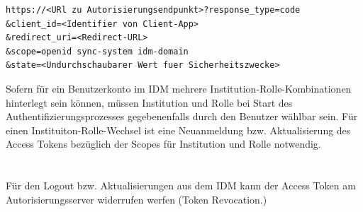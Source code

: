 \begin{lstlisting}[caption={},frame=tlrb]
https://<URl zu Autorisierungsendpunkt>?response_type=code
&client_id=<Identifier von Client-App>
&redirect_uri=<Redirect-URL>
&scope=openid sync-system idm-domain
&state=<Undurchschaubarer Wert fuer Sicherheitszwecke>
\end{lstlisting}

Sofern für ein Benutzerkonto im IDM mehrere Institution-Rolle-Kombinationen hinterlegt sein können, müssen Institution und Rolle bei Start des Authentifizierungsprozesses gegebenenfalls durch den Benutzer wählbar sein. 
Für einen Instituiton-Rolle-Wechsel ist eine Neuanmeldung bzw. Aktualisierung des Access Tokens bezüglich der Scopes für Institution und Rolle notwendig. \\
\\
\\
Für den Logout bzw. Aktualisierungen aus dem IDM kann der Access Token am Autorisierungsserver widerrufen werfen (Token Revocation.)